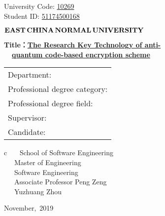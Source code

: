 \newpage

\pagestyle{empty}


\hspace*{8.8 cm} {\large University Code: \underline{10269}}\\
\hspace*{\fill} {\large Student ID: \underline{51174500168}}

\vskip 2cm


\begin{center}
	{\Huge $ \bf{EAST}\,\bf{CHINA}\,\bf{NORMAL}\,
		\bf{UNIVERSITY}$}
\end{center}

\vskip 3cm

\begin{center}
	{\erhao \bf Title：\underline{The Research Key Technology of anti-}}\\
	{\erhao \bf  ~~\qquad \underline{quantum code-based encryption scheme}}
\end{center}


\vskip 2cm {\large
\begin{center}
\begin{tabular}{l}
Department:\\
Professional degree category:\\
Professional degree field:\\
Supervisor:\\
Candidate:
\end{tabular}
\begin{tabular}c
~~~School of Software Engineering       \\
\hline ~~~Master of Engineering    \\
\hline ~~~Software Engineering\\
\hline ~~~Associate Professor Peng Zeng\\
\hline ~~~Yuzhuang Zhou\\
\hline
\end{tabular}
\end{center}}

\vskip 30mm

\begin{center}
{\Large November,~2019}
\end{center}